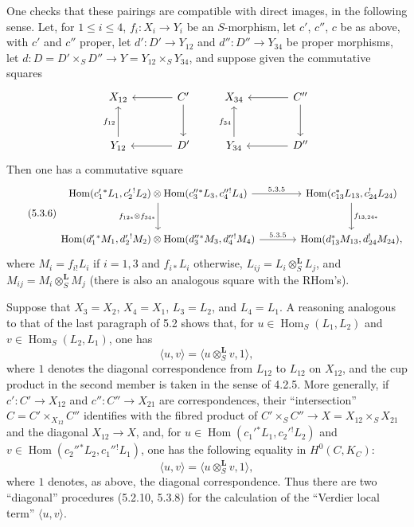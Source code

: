 \documentclass[11pt]{article}
\DeclareMathOperator{\Hom}{Hom}
\providecommand{\RHom}{\mathrm{RHom}}
\providecommand{\RHom}{\mathrm{RHom}}
\providecommand{\Hom}{\operatorname{Hom}}
\providecommand{\RHom}{\mathrm R\mathcal{H}om}
\providecommand{\RHom}{\mathrm{RHom}}
\begin{document}
One checks that these pairings are compatible with direct images, in the following sense. Let, for $1\leq i\leq4$, $f_i:X_i\to Y_i$ be an $S$-morphism, let $c'$, $c''$, $c$ be as above, with $c'$ and $c''$ proper, let $d':D'\to Y_{12}$ and $d'':D''\to Y_{34}$ be proper morphisms, let $d:D=D'\times_SD''\to Y=Y_{12}\times_SY_{34}$, and suppose given the commutative squares
\[
\begin{tikzcd}[column sep=large,row sep=large]
X_{12} & C' \arrow[l] \arrow[d] \\
Y_{12} \arrow[u,"f_{12}"] & D' \arrow[l]
\end{tikzcd}
\qquad
\begin{tikzcd}[column sep=large,row sep=large]
X_{34} & C'' \arrow[l] \arrow[d] \\
Y_{34} \arrow[u,"f_{34}"] & D'' \arrow[l]
\end{tikzcd}
\]
Then one has a commutative square
\begin{equation}
\tag{5.3.6}
\begin{tikzcd}[column sep=large,row sep=large]
\Hom(c_1'{}^*L_1,c_2'{}^!L_2)\otimes\Hom(c_3''{}^*L_3,c_4''{}^!L_4) \arrow[r,"5.3.5"] \arrow[d,"f_{12*}\otimes f_{34*}"']
& \Hom(c_{13}^*L_{13},c_{24}^!L_{24}) \arrow[d,"f_{13,24*}"] \\
\Hom(d_1'{}^*M_1,d_2'{}^!M_2)\otimes\Hom(d_3''{}^*M_3,d_4''{}^!M_4) \arrow[r,"5.3.5"]
& \Hom(d_{13}^*M_{13},d_{24}^!M_{24}),
\end{tikzcd}
\end{equation}
where $M_i=f_{i!}L_i$ if $i=1,3$ and $f_{i*}L_i$ otherwise, $L_{ij}=L_i\otimes_S^{\mathbf L}L_j$, and $M_{ij}=M_i\otimes_S^{\mathbf L}M_j$ (there is also an analogous square with the $\RHom$'s).

Suppose that $X_3=X_2$, $X_4=X_1$, $L_3=L_2$, and $L_4=L_1$. A reasoning analogous to that of the last paragraph of 5.2 shows that, for $u\in\Hom_S(L_1,L_2)$ and $v\in\Hom_S(L_2,L_1)$, one has
\begin{equation}
\tag{5.3.7}
\langle u,v\rangle=\langle u\otimes_S^{\mathbf L}v,1\rangle,
\end{equation}
where $1$ denotes the diagonal correspondence from $L_{12}$ to $L_{12}$ on $X_{12}$, and the cup product in the second member is taken in the sense of 4.2.5. More generally, if $c':C'\to X_{12}$ and $c'':C''\to X_{21}$ are correspondences, their ``intersection'' $C=C'\times_{X_{12}}C''$ identifies with the fibred product of $C'\times_SC''\to X=X_{12}\times_SX_{21}$ and the diagonal $X_{12}\to X$, and, for $u\in\Hom(c_1'{}^*L_1,c_2'{}^!L_2)$ and $v\in\Hom(c_2''{}^*L_2,c_1''{}^!L_1)$, one has the following equality in $H^0(C,K_C)$:
\begin{equation}
\tag{5.3.8}
\langle u,v\rangle=\langle u\otimes_S^{\mathbf L}v,1\rangle,
\end{equation}
where $1$ denotes, as above, the diagonal correspondence. Thus there are two ``diagonal'' procedures (5.2.10, 5.3.8) for the calculation of the ``Verdier local term'' $\langle u,v\rangle$.
\end{document}
